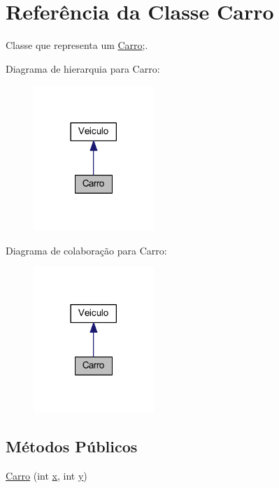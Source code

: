 \hypertarget{class_carro}{}\section{Referência da Classe Carro}
\label{class_carro}


Classe que representa um \mbox{\hyperlink{class_carro}{Carro}};.  




Diagrama de hierarquia para Carro\+:
\nopagebreak
\begin{figure}[H]
\begin{center}
\leavevmode
\includegraphics[width=129pt]{class_carro__inherit__graph}
\end{center}
\end{figure}


Diagrama de colaboração para Carro\+:
\nopagebreak
\begin{figure}[H]
\begin{center}
\leavevmode
\includegraphics[width=129pt]{class_carro__coll__graph}
\end{center}
\end{figure}
\subsection*{Métodos Públicos}
\begin{DoxyCompactItemize}
\item 
\mbox{\hyperlink{class_carro_a52627c022471d194effbc51864c939c8}{Carro}} (int \mbox{\hyperlink{class_veiculo_a069917a284297fe5b385258b2afd9ad6}{x}}, int \mbox{\hyperlink{class_veiculo_af25046404db7c2786c0d9e468bb1fb64}{y}})
\end{DoxyCompactItemize}
